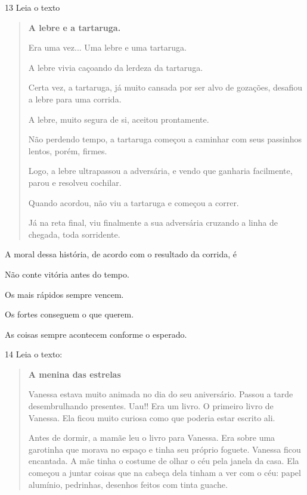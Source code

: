 \num{13} Leia o texto

\begin{quote}
\textbf{A lebre e a tartaruga.}

Era uma vez... Uma lebre e uma tartaruga.

A lebre vivia caçoando da lerdeza da tartaruga.

Certa vez, a tartaruga, já muito cansada por ser alvo de gozações,
desafiou a lebre para uma corrida.

A lebre, muito segura de si, aceitou prontamente.

Não perdendo tempo, a tartaruga começou a caminhar com seus passinhos
lentos, porém, firmes.

Logo, a lebre ultrapassou a adversária, e vendo que ganharia facilmente, parou
e resolveu cochilar.

Quando acordou, não viu a tartaruga e começou a correr.

Já na reta final, viu finalmente a sua adversária cruzando a linha de
chegada, toda sorridente.

\end{quote}

A moral dessa história, de acordo com o resultado da corrida, é

\begin{escolha}
\item Não conte vitória antes do tempo.

\item Os mais rápidos sempre vencem.

\item Os fortes conseguem o que querem.

\item As coisas sempre acontecem conforme o esperado.
\end{escolha}


\num{14} Leia o texto:

\begin{quote}
\textbf{A menina das estrelas}

Vanessa estava muito animada no dia do seu aniversário. Passou a tarde
desembrulhando presentes. Uau!! Era um livro. O primeiro livro de
Vanessa. Ela ficou muito curiosa como que poderia estar escrito ali.

Antes de dormir, a mamãe leu o livro para Vanessa. Era sobre uma
garotinha que morava no espaço e tinha seu próprio foguete. Vanessa
ficou encantada. A mãe tinha o costume de olhar o céu pela janela da
casa. Ela começou a juntar coisas que na cabeça dela tinham a ver com o
céu: papel alumínio, pedrinhas, desenhos feitos com tinta guache.

\end{quote}

